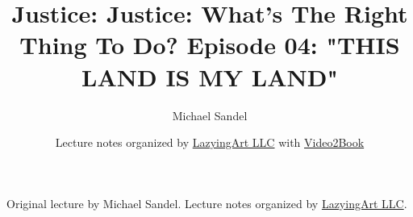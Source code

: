 \documentclass[11pt,oneside]{book}
\begin{document}
\frontmatter
\title{Justice: Justice: What's The Right Thing To Do? Episode 04: "THIS LAND IS MY LAND"}
\author{Michael Sandel}
\date{Lecture notes organized by \href{https://lazying.art}{LazyingArt LLC} with \href{https://github.com/lachlanchen/Video2Book}{Video2Book}}
\maketitle
\begin{center}
\small Original lecture by Michael Sandel. Lecture notes organized by \href{https://lazying.art}{LazyingArt LLC}.
\end{center}
\clearpage
\mainmatter

\end{document}
